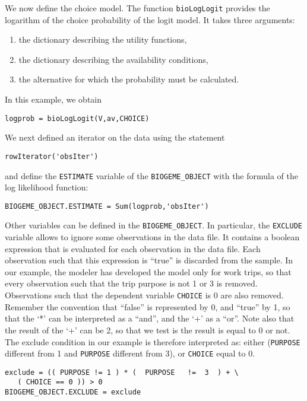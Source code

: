 \documentclass[12pt,a4paper]{article}
\begin{document}
We now define the choice model. The function \lstinline+bioLogLogit+
provides the logarithm of the choice probability of the logit
model. It takes three arguments: 
\begin{enumerate}
\item the dictionary describing the utility functions,
\item the dictionary describing the availability conditions,
\item the alternative for which the probability must be calculated.
\end{enumerate}
In this example, we obtain
\begin{lstlisting}[style=nonumbers]
logprob = bioLogLogit(V,av,CHOICE)
\end{lstlisting}
We next defined an iterator on the data using the statement
\begin{lstlisting}[style=nonumbers]
rowIterator('obsIter') 
\end{lstlisting}
and define the \lstinline+ESTIMATE+ variable of the
\lstinline+BIOGEME_OBJECT+ with the formula of the log likelihood
function:
\begin{lstlisting}[style=nonumbers]
BIOGEME_OBJECT.ESTIMATE = Sum(logprob,'obsIter')
\end{lstlisting}

Other variables can be defined in the \lstinline+BIOGEME_OBJECT+. In
particular, the \lstinline+EXCLUDE+ variable allows to ignore some
observations in the data file. It contains a boolean expression that
is evaluated for each observation in the data file.  Each observation
such that this expression is ``true'' is discarded from the
sample. In our example, the modeler has developed the model only for
work trips, so that every observation such that the trip purpose is not 1
or 3 is removed.
Observations such that the dependent variable \lstinline$CHOICE$ is 0 are also
removed. Remember the convention that ``false'' is represented by 0,
and ``true'' by 1, so that the `*' can be interpreted as a ``and'',
and the `+' as a ``or''. Note also that the result of the `+' can be
2, so that we test is the result is equal to 0 or not. The exclude condition in our example is
therefore interpreted as: either (\lstinline$PURPOSE$ different from 1
and \lstinline$PURPOSE$ different from 3), or \lstinline$CHOICE$ equal
to 0. 

\begin{lstlisting}[style=nonumbers]
exclude = (( PURPOSE != 1 ) * (  PURPOSE   !=  3  ) + \
   ( CHOICE == 0 )) > 0
BIOGEME_OBJECT.EXCLUDE = exclude
\end{lstlisting}
\end{document}
